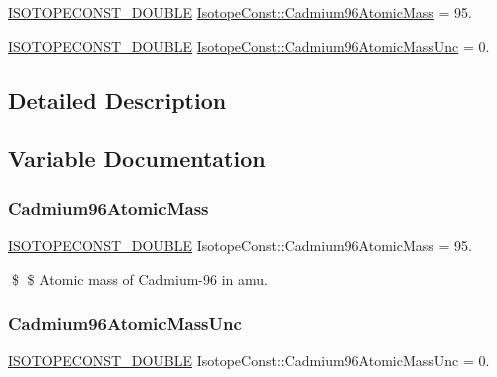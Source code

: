 \begin{DoxyCompactItemize}
\item 
\mbox{\hyperlink{group___isotope_const-_macros_ga8f45a7272ce02c0b4c65c44636ed719a}{I\+S\+O\+T\+O\+P\+E\+C\+O\+N\+S\+T\+\_\+\+D\+O\+U\+B\+LE}} \mbox{\hyperlink{group___isotope_const-_cadmium-_cd96_ga1877183a3243fcd798a194872a381bd5}{Isotope\+Const\+::\+Cadmium96\+Atomic\+Mass}} = 95.
\item 
\mbox{\hyperlink{group___isotope_const-_macros_ga8f45a7272ce02c0b4c65c44636ed719a}{I\+S\+O\+T\+O\+P\+E\+C\+O\+N\+S\+T\+\_\+\+D\+O\+U\+B\+LE}} \mbox{\hyperlink{group___isotope_const-_cadmium-_cd96_ga9fcb8ff6631c565c1cf56175bf97c2d7}{Isotope\+Const\+::\+Cadmium96\+Atomic\+Mass\+Unc}} = 0.
\end{DoxyCompactItemize}


\subsection{Detailed Description}


\subsection{Variable Documentation}
\mbox{\label{group___isotope_const-_cadmium-_cd96_ga1877183a3243fcd798a194872a381bd5}} 
\subsubsection{\texorpdfstring{Cadmium96\+Atomic\+Mass}{Cadmium96AtomicMass}}
{\footnotesize\ttfamily \mbox{\hyperlink{group___isotope_const-_macros_ga8f45a7272ce02c0b4c65c44636ed719a}{I\+S\+O\+T\+O\+P\+E\+C\+O\+N\+S\+T\+\_\+\+D\+O\+U\+B\+LE}} Isotope\+Const\+::\+Cadmium96\+Atomic\+Mass = 95.}

\$ \$ Atomic mass of Cadmium-\/96 in amu. \mbox{\label{group___isotope_const-_cadmium-_cd96_ga9fcb8ff6631c565c1cf56175bf97c2d7}} 
\subsubsection{\texorpdfstring{Cadmium96\+Atomic\+Mass\+Unc}{Cadmium96AtomicMassUnc}}
{\footnotesize\ttfamily \mbox{\hyperlink{group___isotope_const-_macros_ga8f45a7272ce02c0b4c65c44636ed719a}{I\+S\+O\+T\+O\+P\+E\+C\+O\+N\+S\+T\+\_\+\+D\+O\+U\+B\+LE}} Isotope\+Const\+::\+Cadmium96\+Atomic\+Mass\+Unc = 0.}

